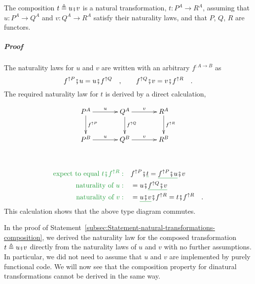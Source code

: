 The composition $t\triangleq u\bef v$ is a natural transformation,
$t:P^{A}\rightarrow R^{A}$, assuming that $u:P^{A}\rightarrow Q^{A}$
and $v:Q^{A}\rightarrow R^{A}$ satisfy their naturality laws, and
that $P$, $Q$, $R$ are functors.

\subparagraph{Proof}

The naturality laws for $u$ and $v$ are written with an arbitrary
$f^{:A\rightarrow B}$ as
\[
f^{\uparrow P}\bef u=u\bef f^{\uparrow Q}\quad,\quad\quad f^{\uparrow Q}\bef v=v\bef f^{\uparrow R}\quad.
\]
The required naturality law for $t$ is derived by a direct calculation,

\begin{wrapfigure}[6]{l}{0.4\columnwidth}%
\vspace{-1.5\baselineskip}
\[
\xymatrix{\xyScaleY{2.0pc}\xyScaleX{3.0pc}P^{A}\ar[d]\sp(0.45){f^{\uparrow P}}\ar[r]\sp(0.5){u} & Q^{A}\ar[d]\sp(0.45){f^{\uparrow Q}}\ar[r]\sp(0.5){v} & R^{A}\ar[d]\sp(0.45){f^{\uparrow R}}\\
P^{B}\ar[r]\sp(0.5){u} & Q^{B}\ar[r]\sp(0.5){v} & R^{B}
}
\]

\vspace{-0\baselineskip}
\end{wrapfigure}%

~\vspace{-1.8\baselineskip}

\begin{align*}
{\color{greenunder}\text{expect to equal }t\bef f^{\uparrow R}:}\quad & f^{\uparrow P}\bef\gunderline t=\gunderline{f^{\uparrow P}\bef u}\bef v\\
{\color{greenunder}\text{naturality of }u:}\quad & =u\bef\gunderline{f^{\uparrow Q}\bef v}\\
{\color{greenunder}\text{naturality of }v:}\quad & =\gunderline{u\bef v}\bef f^{\uparrow R}=t\bef f^{\uparrow R}\quad.
\end{align*}
This calculation shows that the above type diagram commutes.

In the proof of Statement~\ref{subsec:Statement-natural-transformations-composition},
we derived the naturality law for the composed transformation $t\triangleq u\bef v$
directly from the naturality laws of $u$ and $v$ with no further
assumptions. In particular, we did not need to assume that $u$ and
$v$ are implemented by purely functional code. We will now see that
the composition property for dinatural transformations cannot be derived
in the same way. 

